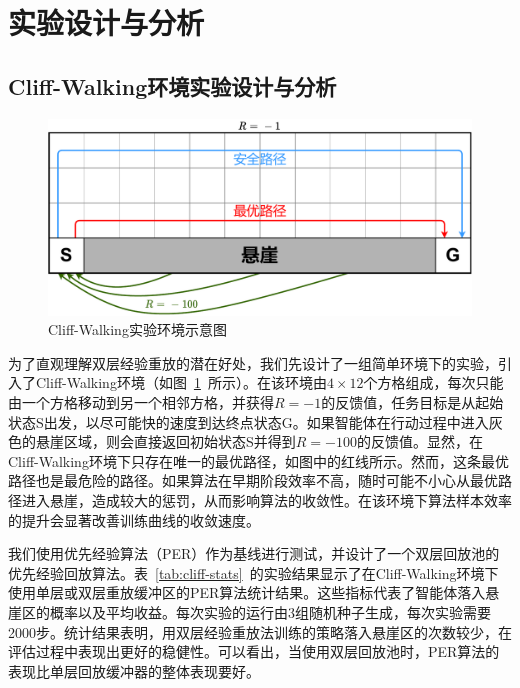 \section{实验设计与分析}

\subsection{Cliff-Walking环境实验设计与分析}

\begin{figure}[t]
\centering
\includegraphics[width=\textwidth]{figures/cliff-env.pdf}
\caption{Cliff-Walking实验环境示意图}
\label{fig:cliff-env}
\end{figure}


为了直观理解双层经验重放的潜在好处，我们先设计了一组简单环境下的实验，引入了Cliff-Walking环境（如图~\ref{fig:cliff-env}~所示）。在该环境由$4\times 12$个方格组成，每次只能由一个方格移动到另一个相邻方格，并获得$R=-1$的反馈值，任务目标是从起始状态S出发，以尽可能快的速度到达终点状态G。如果智能体在行动过程中进入灰色的悬崖区域，则会直接返回初始状态S并得到$R=-100$的反馈值。显然，在Cliff-Walking环境下只存在唯一的最优路径，如图中的红线所示。然而，这条最优路径也是最危险的路径。如果算法在早期阶段效率不高，随时可能不小心从最优路径进入悬崖，造成较大的惩罚，从而影响算法的收敛性。在该环境下算法样本效率的提升会显著改善训练曲线的收敛速度。

我们使用优先经验算法（PER）作为基线进行测试，并设计了一个双层回放池的优先经验回放算法。表~\ref{tab:cliff-stats}~的实验结果显示了在Cliff-Walking环境下使用单层或双层重放缓冲区的PER算法统计结果。这些指标代表了智能体落入悬崖区的概率以及平均收益。每次实验的运行由3组随机种子生成，每次实验需要2000步。统计结果表明，用双层经验重放法训练的策略落入悬崖区的次数较少，在评估过程中表现出更好的稳健性。可以看出，当使用双层回放池时，PER算法的表现比单层回放缓冲器的整体表现要好。

